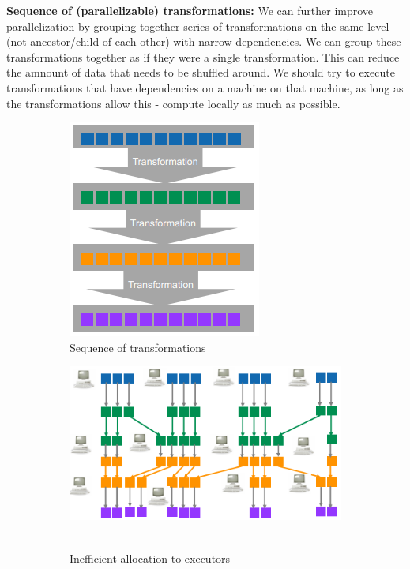 \documentclass[11pt,oneside,a4paper]{article}
\begin{document}
\textbf{Sequence of (parallelizable) transformations:} We can further improve parallelization by grouping together series of transformations on the same level (not ancestor/child of each other) with narrow dependencies. We can group these transformations together as if they were a single transformation. This can reduce the amnount of data that needs to be shuffled around. We should try to execute transformations that have dependencies on a machine on that machine, as long as the transformations allow this - compute locally as much as possible.

\begin{figure}[hb!]
	\centering
	\begin{subfigure}[t]{.3\textwidth}
		\centering
		\includegraphics[width=0.5\linewidth]{figures/spark_transformation_sequence}
		\caption{Sequence of transformations}
	\end{subfigure}%
	\begin{subfigure}[t]{.3\textwidth}
		\centering
		\includegraphics[width=0.8\linewidth]{figures/spark_transformation_sequence_ineff}\
		\caption{Inefficient allocation to executors}
	\end{subfigure}
	\begin{subfigure}[t]{.3\textwidth}

\end{subfigure}
\end{figure}
\end{document}
